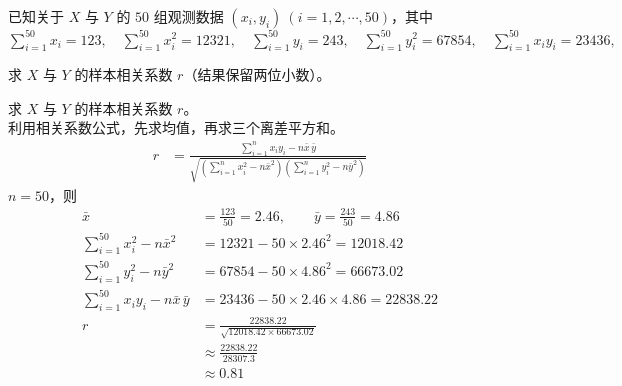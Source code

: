 \documentclass[12pt,a4paper]{exam-zh}
\begin{document}
\begin{question}
    已知关于 $X$ 与 $Y$ 的 $50$ 组观测数据 $(x_i,y_i)\ (i=1,2,\cdots,50)$，其中
    $        \displaystyle
        \sum\limits_{i=1}^{50}x_i=123,\quad \sum\limits_{i=1}^{50}x_i^2=12321,\quad
        \sum\limits_{i=1}^{50}y_i=243,\quad \sum\limits_{i=1}^{50}y_i^2=67854,\quad
        \sum\limits_{i=1}^{50}x_iy_i=23436,$

    求 $X$ 与 $Y$ 的样本相关系数 $r$（结果保留两位小数）。
\end{question}

\begin{solution}
    求 $X$ 与 $Y$ 的样本相关系数 $r$。\\
    利用相关系数公式，先求均值，再求三个离差平方和。\\
    \begin{align*}
        r &= \frac{\displaystyle\sum\limits_{i=1}^{n}x_iy_i-n\bar{x}\,\bar{y}}
        {\sqrt{\left(\displaystyle\sum\limits_{i=1}^{n}x_i^2-n\bar{x}^2\right)\left(\displaystyle\sum\limits_{i=1}^{n}y_i^2-n\bar{y}^2\right)}}
    \end{align*}
    $n=50$，则
    \begin{align*}
        \bar{x} &= \frac{123}{50}=2.46, \qquad \bar{y}=\frac{243}{50}=4.86 \\
        \sum\limits_{i=1}^{50}x_i^2-n\bar{x}^2 &= 12321-50\times 2.46^2=12018.42 \\
        \sum\limits_{i=1}^{50}y_i^2-n\bar{y}^2 &= 67854-50\times 4.86^2=66673.02 \\
        \sum\limits_{i=1}^{50}x_iy_i-n\bar{x}\,\bar{y} &= 23436-50\times 2.46\times 4.86=22838.22 \\
        r &= \frac{22838.22}{\sqrt{12018.42\times 66673.02}} \\
        &\approx \frac{22838.22}{28307.3} \\
        &\approx 0.81
    \end{align*}
\end{solution}
\end{document}
